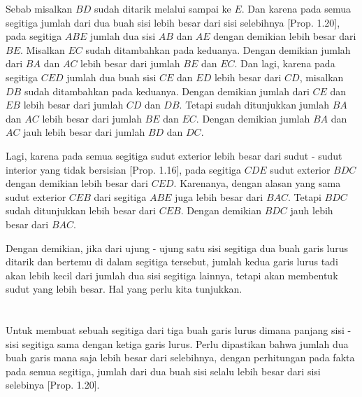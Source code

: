 \documentclass[a4paper]{book}
\begin{document}
Sebab misalkan $BD$ sudah ditarik melalui sampai ke $E$. Dan karena pada semua
segitiga jumlah dari dua buah sisi lebih besar dari sisi selebihnya 
[Prop. 1.20], pada segitiga $ABE$ jumlah dua sisi $AB$ dan $AE$ dengan demikian
lebih besar dari $BE$. Misalkan $EC$ sudah ditambahkan pada keduanya. Dengan 
demikian jumlah dari $BA$ dan $AC$ lebih besar dari jumlah $BE$ dan $EC$. Dan 
lagi, karena pada segitiga $CED$ jumlah dua buah sisi $CE$ dan $ED$ lebih
besar dari $CD$, misalkan $DB$ sudah ditambahkan pada keduanya. Dengan demikian
jumlah dari $CE$ dan $EB$ lebih besar dari jumlah $CD$ dan $DB$. Tetapi
sudah ditunjukkan jumlah $BA$ dan $AC$ lebih besar dari jumlah $BE$ dan $EC$.
Dengan demikian jumlah $BA$ dan $AC$ jauh lebih besar dari jumlah $BD$ 
dan $DC$.

Lagi, karena pada semua segitiga sudut exterior lebih besar dari sudut - sudut
interior yang tidak bersisian [Prop. 1.16], pada segitiga $CDE$ sudut exterior
$BDC$ dengan demikian lebih besar dari $CED$. Karenanya, dengan alasan yang
sama sudut exterior $CEB$ dari segitiga $ABE$ juga lebih
besar dari $BAC$. Tetapi $BDC$ sudah ditunjukkan lebih besar dari $CEB$. Dengan
demikian $BDC$ jauh lebih besar dari $BAC$.
 
Dengan demikian, jika dari ujung - ujung satu sisi segitiga dua buah 
garis lurus ditarik dan bertemu di dalam segitiga tersebut, jumlah kedua 
garis lurus tadi akan lebih kecil dari jumlah dua sisi segitiga lainnya, 
tetapi akan membentuk sudut
yang lebih besar. Hal yang perlu kita tunjukkan.


\section*{\centering \thesection}
Untuk membuat sebuah segitiga dari tiga buah garis lurus dimana panjang
sisi - sisi segitiga sama dengan ketiga garis lurus. Perlu dipastikan bahwa
jumlah dua buah garis mana saja lebih besar dari selebihnya, dengan 
perhitungan pada fakta pada semua segitiga, jumlah dari dua buah sisi
selalu lebih besar dari sisi selebinya [Prop. 1.20].
\begin{center}
\end{center}
\end{document}
